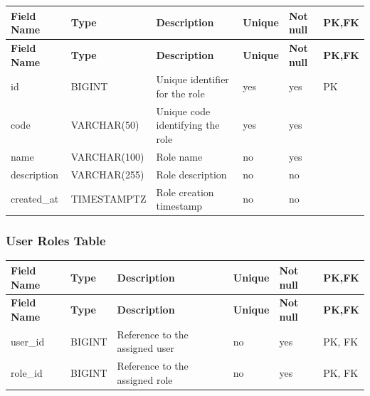 \vspace{0.5em}
\renewcommand{\arraystretch}{1.15}
\setlength{\tabcolsep}{4pt}
\small
\begin{longtable}{|>{\raggedright\arraybackslash}p{}|>{\raggedright\arraybackslash}p{}|>{\raggedright\arraybackslash}p{}|>{\centering\arraybackslash}p{}|>{\centering\arraybackslash}p{}|>{\centering\arraybackslash}p{}|}
\hline
\textbf{Field Name} & \textbf{Type} & \textbf{Description} & \textbf{Unique} & \textbf{Not null} & \textbf{PK,FK} \\
\hline
\endfirsthead
\textbf{Field Name} & \textbf{Type} & \textbf{Description} & \textbf{Unique} & \textbf{Not null} & \textbf{PK,FK} \\
\hline
\endhead
id & BIGINT & Unique identifier for the role & yes & yes & PK \\
\hline
code & VARCHAR(50) & Unique code identifying the role & yes & yes & \\
\hline
name & VARCHAR(100) & Role name & no & yes & \\
\hline
description & VARCHAR(255) & Role description & no & no & \\
\hline
created\_at & TIMESTAMPTZ & Role creation timestamp & no & no & \\
\hline
\end{longtable}

\vspace{1em}
\subsubsection{User Roles Table}
\label{subsubsec:user-roles-table}

\vspace{0.5em}
\renewcommand{\arraystretch}{1.15}
\setlength{\tabcolsep}{4pt}
\small
\begin{longtable}{|>{\raggedright\arraybackslash}p{}|>{\raggedright\arraybackslash}p{}|>{\raggedright\arraybackslash}p{}|>{\centering\arraybackslash}p{}|>{\centering\arraybackslash}p{}|>{\centering\arraybackslash}p{}|}
\hline
\textbf{Field Name} & \textbf{Type} & \textbf{Description} & \textbf{Unique} & \textbf{Not null} & \textbf{PK,FK} \\
\hline
\endfirsthead
\textbf{Field Name} & \textbf{Type} & \textbf{Description} & \textbf{Unique} & \textbf{Not null} & \textbf{PK,FK} \\
\hline
\endhead
user\_id & BIGINT & Reference to the assigned user & no & yes & PK, FK \\
\hline
role\_id & BIGINT & Reference to the assigned role & no & yes & PK, FK \\
\hline
\end{longtable}

